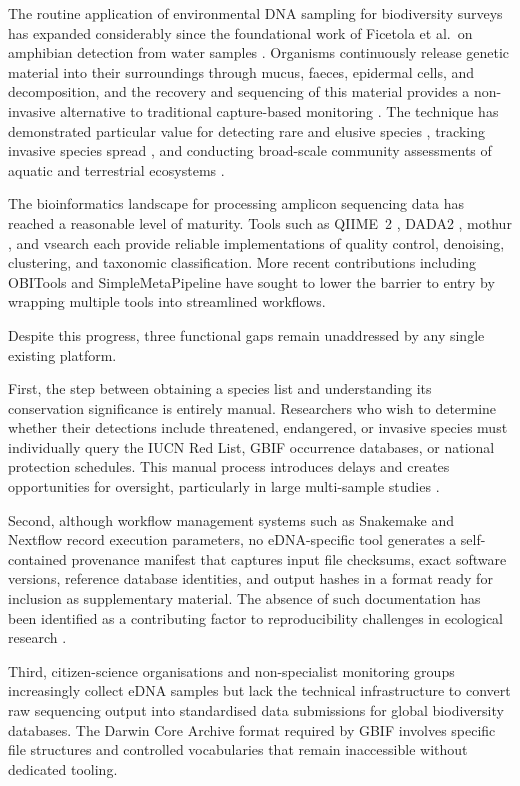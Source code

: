 \documentclass[runningheads]{llncs}
\begin{document}
The routine application of environmental DNA sampling for biodiversity surveys has expanded considerably since the foundational work of Ficetola et al.\ on amphibian detection from water samples \cite{ficetola2008}. Organisms continuously release genetic material into their surroundings through mucus, faeces, epidermal cells, and decomposition, and the recovery and sequencing of this material provides a non-invasive alternative to traditional capture-based monitoring \cite{taberlet2012, deiner2017}. The technique has demonstrated particular value for detecting rare and elusive species \cite{pfleger2016}, tracking invasive species spread \cite{larson2020}, and conducting broad-scale community assessments of aquatic and terrestrial ecosystems \cite{bonfil2021}.

The bioinformatics landscape for processing amplicon sequencing data has reached a reasonable level of maturity. Tools such as QIIME~2 \cite{bolyen2019}, DADA2 \cite{callahan2016}, mothur \cite{schloss2011}, and vsearch \cite{rognes2016} each provide reliable implementations of quality control, denoising, clustering, and taxonomic classification. More recent contributions including OBITools \cite{boyer2016} and SimpleMetaPipeline \cite{williams2024} have sought to lower the barrier to entry by wrapping multiple tools into streamlined workflows.

Despite this progress, three functional gaps remain unaddressed by any single existing platform.

First, the step between obtaining a species list and understanding its conservation significance is entirely manual. Researchers who wish to determine whether their detections include threatened, endangered, or invasive species must individually query the IUCN Red List, GBIF occurrence databases, or national protection schedules. This manual process introduces delays and creates opportunities for oversight, particularly in large multi-sample studies \cite{lee2024}.

Second, although workflow management systems such as Snakemake and Nextflow record execution parameters, no eDNA-specific tool generates a self-contained provenance manifest that captures input file checksums, exact software versions, reference database identities, and output hashes in a format ready for inclusion as supplementary material. The absence of such documentation has been identified as a contributing factor to reproducibility challenges in ecological research \cite{powers2019, sandve2013}.

Third, citizen-science organisations and non-specialist monitoring groups increasingly collect eDNA samples but lack the technical infrastructure to convert raw sequencing output into standardised data submissions for global biodiversity databases. The Darwin Core Archive format required by GBIF \cite{gbif2023} involves specific file structures and controlled vocabularies that remain inaccessible without dedicated tooling.
\end{document}
